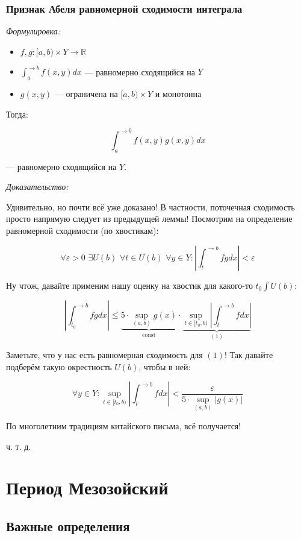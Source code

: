 \documentclass{article}
\def\dbl{\,\,}
\DeclareMathOperator{\const}{const}
\begin{document}
\subsubsection{Признак Абеля равномерной сходимости интеграла}
\textit{Формулировка:}

\begin{itemize}
    \item $f, g: [a, b) \times Y \rightarrow \mathbb{R}$
    \item $\int_{a}^{\rightarrow b} f(x, y) dx$ --- равномерно сходящийся на $Y$
    \item $g(x, y)$ --- ограничена на $[a, b) \times Y$ и монотонна
\end{itemize}

Тогда:

\[\int_{a}^{\rightarrow b} f(x, y) g(x, y) dx\]

--- равномерно сходящийся на $Y$.

\textit{Доказательство:}

Удивительно, но почти всё уже доказано! В частности, поточечная сходимость просто напрямую следует из предыдущей леммы! Посмотрим на определение равномерной сходимости (по хвостикам):

\[\forall \varepsilon > 0 \dbl \exists U(b) \dbl \forall t \in U(b) \dbl \forall y \in Y: \left| \int_t^{\rightarrow b} fg dx\right| < \varepsilon\]

Ну чтож, давайте применим нашу оценку на хвостик для какого-то $t_0 \int U(b)$:

\[\left| \int_{t_0}^{\rightarrow b} fg dx\right| \le \underbrace{5 \cdot \sup_{(a, b)}g(x)}_{\const} \cdot \underbrace{\sup_{t \in[t_0, b)} \left| \int_t^{\rightarrow b} f dx\right|}_{(1)}\]

Заметьте, что у нас есть равномерная сходимость для $(1)$! Так давайте подберём такую окрестность $U(b)$, чтобы в ней:

\[\forall y \in Y : \sup_{t \in[t_0, b)} \left| \int_t^{\rightarrow b} f dx\right| < \frac{\varepsilon}{5 \cdot \sup_{(a, b)} |g(x)|}\]

По многолетним традициям китайского письма, всё получается!

ч. т. д. 
\newpage

\section{Период Мезозойский}
\subsection{Важные определения}
\end{document}

